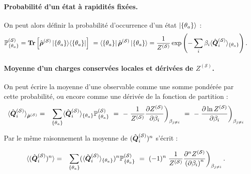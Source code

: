 \paragraph{Probabilité d’un état à rapidités fixées.}
On peut alors définir la probabilité d’occurrence d’un état $\ket{\{ \theta_a \} }$ :
\begin{eqnarray}
	\mathbb{P}^{(\mathcal{S})}_{\{ \theta_a \}}  =  \bm{\mathrm{Tr}} \left [\operator{\rho}^{(\mathcal{S})} \ket{\{\theta_a \}}\!\bra{\{\theta_a \}} \right ] =  \bra{\{\theta_a \}}	\operator{\rho}^{(\mathcal{S})} \ket{\{\theta_a \}}  = \frac{1}{Z^{(\mathcal{S})}} \exp \left (- \sum_i \beta_i \langle \operator{Q}_i^{(\mathcal{S})} \rangle_{\{\theta_a \}} \right ) .
\end{eqnarray}

\paragraph{Moyenne d’un charges conservées locales et dérivées de $Z^{(\mathcal{S})}$.}
On peut écrire la moyenne d’une observable comme une somme pondérée par cette probabilité, ou encore comme une dérivée de la fonction de partition :
\begin{eqnarray}
	\langle \hat{\bm{Q}}_i^{(\mathcal{S})} \rangle_{\hat{\bm{\rho}}^{(\mathcal{S})}} &= & \sum_{\{ \theta_a\}} \langle \hat{\bm{Q}}_i^{(\mathcal{S})} \rangle_{\{\theta_a \}} \mathbb{P}^{(\mathcal{S})}_{\{ \theta_a \}} ~=~- \left. \frac{1}{Z^{(\mathcal{S})}} \frac{\partial Z^{(\mathcal{S})}}{\partial \beta_i} \right )_{\beta_{j \neq i }} ~=~ - 	\left . \frac{\partial  \ln Z^{(\mathcal{S})}}{\partial \beta_i} \right )_{\beta_{j \neq i }}	
\end{eqnarray}

Par le même raisonnement la moyenne de $(\hat{\bm{Q}}_i^{(\mathcal{S})})^n$ s'écrit :

\begin{eqnarray}
	\langle (\hat{\bm{Q}}_i^{(\mathcal{S})})^n \rangle &= & \sum_{\{ \theta_a\}} (\langle\hat{\bm{Q}}_i^{(\mathcal{S})}\rangle_{\{\theta_a\}})^n \mathbb{P}^{(\mathcal{S})}_{\{ \theta_a \}} ~=~ (-1)^n \left. \frac{1}{Z^{(\mathcal{S})}} \frac{\partial^n Z^{(\mathcal{S})}}{{(\partial \beta_i)}^n} \right )_{\beta_{j \neq i }} .	
\end{eqnarray}

